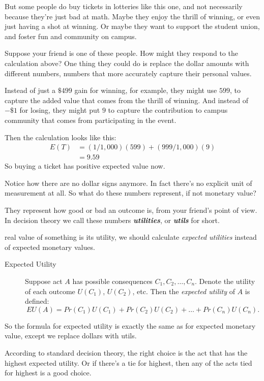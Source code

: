 \documentclass[justified]{tufte-book}
\renewcommand{\u}{U}
\newcommand{\p}{Pr}
\newcommand{\E}{E}
\newcommand{\EU}{EU}
\theoremstyle{definition}
\theoremstyle{definition}
\theoremstyle{definition}
\theoremstyle{definition}
\theoremstyle{remark}
\begin{document}
But some people do buy tickets in lotteries like this one, and not necessarily because they're just bad at math. Maybe they enjoy the thrill of winning, or even just having a shot at winning. Or maybe they want to support the student union, and foster fun and community on campus.

Suppose your friend is one of these people. How might they respond to the calculation above? One thing they could do is replace the dollar amounts with different numbers, numbers that more accurately capture their personal values.

Instead of just a \(\$499\) gain for winning, for example, they might use \(599\), to capture the added value that comes from the thrill of winning. And instead of \(-\$1\) for losing, they might put \(9\) to capture the contribution to campus community that comes from participating in the event.

Then the calculation looks like this:
\[
  \begin{aligned}
    \E(T) &= (1/1,000)(599) + (999/1,000)(9)\\
          &= 9.59
  \end{aligned}
\]
So buying a ticket has positive expected value now.

Notice how there are no dollar signs anymore. In fact there's no explicit unit of measurement at all. So what do these numbers represent, if not monetary value?

They represent how good or bad an outcome is, from your friend's point of view. In decision theory we call these numbers \textbf{\emph{utilities}}, or \textbf{\emph{utils}} for short.

 real value of something is its utility, we should calculate \emph{expected utilities} instead of expected monetary values.

\begin{description}
\item[Expected Utility]
Suppose act \(A\) has possible consequences \(C_1, C_2, \ldots,C_n\). Denote the utility of each outcome \(U(C_1)\), \(U(C_2)\), etc. Then the \emph{expected utility} of \(A\) is defined:
\[ \EU(A) = \p(C_1)\u(C_1) + \p(C_2)\u(C_2) + \ldots + \p(C_n)\u(C_n). \]
\end{description}

So the formula for expected utility is exactly the same as for expected monetary value, except we replace dollars with utils.

According to standard decision theory, the right choice is the act that has the highest expected utility. Or if there's a tie for highest, then any of the acts tied for highest is a good choice.
\end{document}
